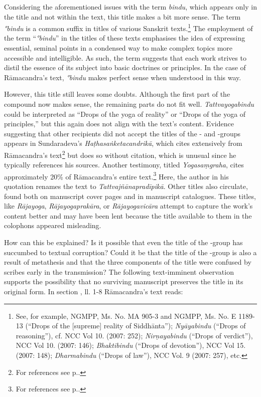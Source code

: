 Considering the aforementioned issues with the term \textit{bindu}, which appears only in the title and not within the text, this title makes a bit more sense. The term \textit{°bindu} is a common suffix in titles of various Sanskrit texts.\footnote{See, for example, \nocite{stb2} NGMPP, Ms. No. MA 905-3 and NGMPP, Ms. No. E 1189-13 (``Drops of the [supreme] reality of Siddhānta''); \emph{Nyāyabindu} (``Drops of reasoning''), cf. \nocite{newcataloguscatalogorum10} NCC Vol 10. (2007: 252); \emph{Nirṇayabindu} (``Drops of verdict''), NCC Vol 10. (2007: 146); \emph{Bhaktibindu} (``Drops of devotion''), NCC Vol 15. (2007: 148); \emph{Dharmabindu} (``Drops of law''), NCC Vol. 9 (2007: 257), etc.\nocite{newcataloguscatalogorum9}\nocite{newcataloguscatalogorum15}} The employment of the term ``\textit{°bindu}'' in the titles of these texts emphasises the idea of expressing essential, seminal points in a condensed way to make complex topics more accessible and intelligible. As such, the term suggests that each work strives to distil the essence of its subject into basic doctrines or principles. In the case of Rāmacandra's text, \textit{°bindu} makes perfect sense when understood in this way.     

However, this title still leaves some doubts. Although the first part of the compound now makes sense, the remaining parts do not fit well. \emph{Tattvayogabindu} could be interpreted as ``Drops of the yoga of reality'' or ``Drops of the yoga of principles,'' but this again does not align with the text's content. Evidence suggesting that other recipients did not accept the titles of the \alpha- and \beta-groups appears in Sundaradeva's \emph{Haṭhasaṅketacandrikā}, which cites extensively from Rāmacandra's text\footnote{For references see p.\pageref{hathacandrika}.} but does so without citation, which is unusual since he typically references his sources. Another testimony, titled \emph{Yogasaṃgraha}, cites approximately 20\% of Rāmacandra's entire text.\footnote{For references see p.\pageref{yogasamgraha}.} Here, the author in his quotation renames the text to \emph{Tattvajñānapradīpikā}. Other titles also circulate, found both on manuscript cover pages and in manuscript catalogues. These titles, like \emph{Rājayoga}, \emph{Rājayogaprakāra}, or \emph{Rājayogavicāra} attempt to capture the work's content better and may have been lent because the title available to them in the colophons appeared misleading. 

How can this be explained? Is it possible that even the title of the \alpha-group has succumbed to textual corruption? Could it be that the title of the \alpha-group is also a result of metathesis and that the three components of the title were confused by scribes early in the transmission? The following text-imminent observation supports the possibility that no surviving manuscript preserves the title in its original form. In section , ll. 1-8 Rāmacandra's text reads:

